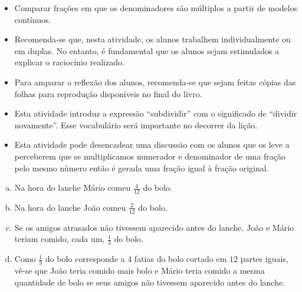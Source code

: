 \newpage

\begin{objetivos}[label=chap4-ativ4]{}{}
\begin{itemize} %
    \item       Comparar frações em que os denominadores são múltiplos a
partir de modelos contínuos.
\end{itemize} %
\vspace{.15cm}
\end{objetivos}

\begin{orientacoes}{}{}

\begin{itemize}
    \item       Recomenda-se que, nesta atividade, os alunos trabalhem
individualmente ou em duplas. No entanto, é fundamental que os alunos sejam
estimulados a explicar o raciocínio realizado.
    \item       Para amparar a reflexão dos alunos, recomenda-se que sejam
feitas cópias das             folhas para reprodução disponíveis no final do
livro.
    \item       Esta atividade introduz a expressão ``subdividir'' com o significado de ``dividir novamente''. Esse vocabulário será importante no decorrer da lição.
    \item       Esta atividade pode desencadear uma discussão com os alunos que
os leve a perceberem que se multiplicamos numerador e denominador de
uma fração pelo mesmo número então é gerada uma fração igual à fração
original.
\end{itemize} %
\end{orientacoes}

\begin{solucao}{}{}
  \begin{enumerate}[a)]     
  \item Na hora do lanche Mário comeu $\frac{4}{12}$ do bolo.
  \item Na hora do lanche João comeu   $\frac{2}{12}$ do    bolo.
  \item Se os amigos atrasados não tivessem aparecido antes do lanche, João e Mário teriam comido, cada um,   $\frac{1}{3}$   do bolo.
  \item Como   $\frac{1}{3}$ do bolo corresponde a   $4$   fatias do bolo cortado em   $12$   partes iguais, vê-se que João teria comido mais bolo e Mário teria comido a mesma quantidade de bolo se seus amigos não tivessem aparecido antes do lanche.
  \end{enumerate}
\end{solucao}

